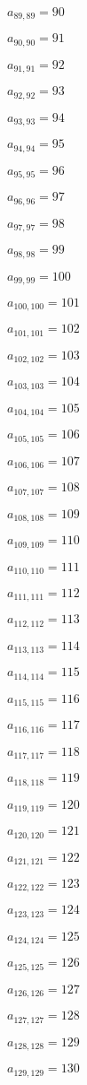 \documentclass[a4paper,12pt]{article}
\begin{document}
$a _{ 89, 89 } = 90$

$a _{ 90, 90 } = 91$

$a _{ 91, 91 } = 92$

$a _{ 92, 92 } = 93$

$a _{ 93, 93 } = 94$

$a _{ 94, 94 } = 95$

$a _{ 95, 95 } = 96$

$a _{ 96, 96 } = 97$

$a _{ 97, 97 } = 98$

$a _{ 98, 98 } = 99$

$a _{ 99, 99 } = 100$

$a _{ 100, 100 } = 101$

$a _{ 101, 101 } = 102$

$a _{ 102, 102 } = 103$

$a _{ 103, 103 } = 104$

$a _{ 104, 104 } = 105$

$a _{ 105, 105 } = 106$

$a _{ 106, 106 } = 107$

$a _{ 107, 107 } = 108$

$a _{ 108, 108 } = 109$

$a _{ 109, 109 } = 110$

$a _{ 110, 110 } = 111$

$a _{ 111, 111 } = 112$

$a _{ 112, 112 } = 113$

$a _{ 113, 113 } = 114$

$a _{ 114, 114 } = 115$

$a _{ 115, 115 } = 116$

$a _{ 116, 116 } = 117$

$a _{ 117, 117 } = 118$

$a _{ 118, 118 } = 119$

$a _{ 119, 119 } = 120$

$a _{ 120, 120 } = 121$

$a _{ 121, 121 } = 122$

$a _{ 122, 122 } = 123$

$a _{ 123, 123 } = 124$

$a _{ 124, 124 } = 125$

$a _{ 125, 125 } = 126$

$a _{ 126, 126 } = 127$

$a _{ 127, 127 } = 128$

$a _{ 128, 128 } = 129$

$a _{ 129, 129 } = 130$
\end{document}
